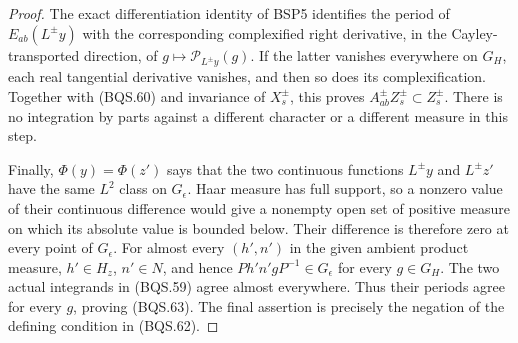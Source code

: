 \documentclass[11pt,a4paper]{article}
\numberwithin{equation}{section}
\theoremstyle{remark}\newtheorem{remark}[theorem]{Remark}
\begin{document}
\begin{proof}
The exact differentiation identity of BSP5 identifies the period
of $E_{ab}(L^\pm y)$ with the corresponding complexified right
derivative, in the Cayley-transported direction, of
$g\mapsto\mathcal P_{L^\pm y}(g)$.
If the latter vanishes everywhere on $G_H$, each real tangential
derivative vanishes, and then so does its complexification.
Together with (BQS.60) and invariance of $X_s^\pm$, this proves
$A^\pm_{ab}Z_s^\pm\subset Z_s^\pm$.
There is no integration by parts against a different character or
a different measure in this step.

Finally, $\Phi(y)=\Phi(z')$ says that the two continuous functions
$L^\pm y$ and $L^\pm z'$ have the same $L^2$ class on
$G_\epsilon$.  Haar measure has full support, so a nonzero value
of their continuous difference would give a nonempty open set
of positive measure on which its absolute value is bounded below.
Their difference is therefore zero at every point of $G_\epsilon$.
For almost every $(h',n')$ in the given ambient product measure,
$h'\in H_z$, $n'\in N$, and hence
$P h'n'gP^{-1}\in G_\epsilon$ for every $g\in G_H$.
The two actual integrands in (BQS.59) agree almost everywhere.
Thus their periods agree for every $g$, proving (BQS.63).
The final assertion is precisely the negation of the defining
condition in (BQS.62).
\end{proof}

\end{document}
